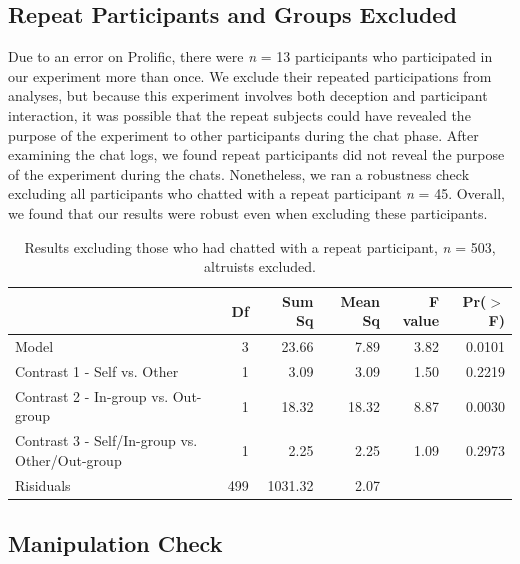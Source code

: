 \documentclass[12pt,]{article}
\begin{document}

\newpage
\subsection{Repeat Participants and Groups Excluded}
\label{appendix:exclude}

Due to an error on Prolific, there were \emph{n} = 13 participants who participated in our experiment more than once. We exclude their repeated participations from analyses, but because this experiment involves both deception and participant interaction, it was possible that the repeat subjects could have revealed the purpose of the experiment to other participants during the chat phase. After examining the chat logs, we found repeat participants did not reveal the purpose of the experiment during the chats. Nonetheless, we ran a robustness check excluding all participants who chatted with a repeat participant \emph{n} = 45. Overall, we found that our results were robust even when excluding these participants.  

\vspace{0.6cm}

\begin{table}[ht]
\centering
\begin{tabular}{lrrrrr}
  \hline
 & Df & Sum Sq & Mean Sq & F value & Pr($>$F) \\ 
  \hline
Model & 3 & 23.66 & 7.89 & 3.82 & 0.0101 \\ 
  Contrast 1 - Self vs. Other & 1 & 3.09 & 3.09 & 1.50 & 0.2219 \\ 
  Contrast 2 - In-group vs. Out-group & 1 & 18.32 & 18.32 & 8.87 & 0.0030 \\ 
  Contrast 3 - Self/In-group vs. Other/Out-group & 1 & 2.25 & 2.25 & 1.09 & 0.2973 \\ 
  Risiduals & 499 & 1031.32 & 2.07 &  &  \\ 
   \hline
\end{tabular}
\caption{Results excluding those who had chatted with a repeat participant, \emph{n} = 503, altruists excluded.} 
\label{repeats}
\end{table}


\newpage
\subsection{Manipulation Check}
\label{appendix:manip2}
\end{document}
